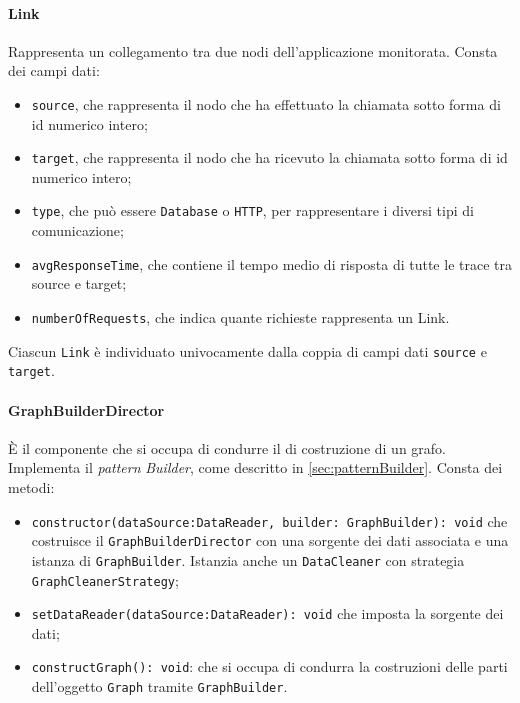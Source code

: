 \paragraph{Link}\Spazio
Rappresenta un collegamento tra due nodi dell'applicazione monitorata. Consta dei campi dati:
\begin{itemize}
	\item{\texttt{source}, che rappresenta il nodo che ha effettuato la chiamata sotto forma di id numerico intero;}
	\item{\texttt{target}, che rappresenta il nodo che ha ricevuto la chiamata sotto forma di id numerico intero;}
	\item{\texttt{type}, che può essere \texttt{Database} o \texttt{HTTP}, per rappresentare i diversi tipi di comunicazione;}
	\item{\texttt{avgResponseTime}, che contiene il tempo medio di risposta di tutte le trace tra source e target;}
	\item{\texttt{numberOfRequests}, che indica quante richieste rappresenta un Link.}
\end{itemize}
Ciascun \texttt{Link} è individuato univocamente dalla coppia di campi dati \texttt{source} e \texttt{target}.

\paragraph{GraphBuilderDirector} \Spazio
È il componente che si occupa di condurre il  di costruzione di un grafo. Implementa il \emph{pattern} \emph{Builder}, come descritto in \ref{sec:patternBuilder}. Consta dei metodi:
\begin{itemize}
	\item \texttt{constructor(dataSource:DataReader, builder: GraphBuilder): void} che costruisce il \texttt{GraphBuilderDirector} con una sorgente dei dati associata e una istanza di \texttt{GraphBuilder}. Istanzia anche un \texttt{DataCleaner} con strategia \texttt{GraphCleanerStrategy}; 
	\item \texttt{setDataReader(dataSource:DataReader): void} che imposta la sorgente dei dati; 
	\item \texttt{constructGraph(): void}: che si occupa di condurra la costruzioni delle parti dell'oggetto \texttt{Graph} tramite \texttt{GraphBuilder}.
\end{itemize}

